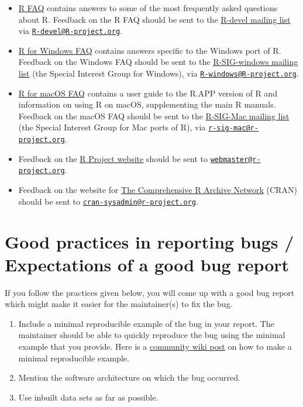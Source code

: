 \documentclass[
]{book}
\providecommand{\tightlist}{%
  \setlength{\itemsep}{0pt}\setlength{\parskip}{0pt}}
\begin{document}
\begin{itemize}
\tightlist
\item
  \href{https://cran.r-project.org/doc/FAQ/R-FAQ.html}{R FAQ} contains answers to some of the most frequently asked questions about R. Feedback on the R FAQ should be sent to the \href{https://stat.ethz.ch/mailman/listinfo/r-devel}{R-devel mailing list} via \href{mailto:R-devel@R-project.org}{\nolinkurl{R-devel@R-project.org}}.
\item
  \href{https://cran.r-project.org/bin/windows/base/rw-FAQ.html}{R for Windows FAQ} contains answers specific to the Windows port of R. Feedback on the Windows FAQ should be sent to the \href{https://stat.ethz.ch/mailman/listinfo/r-sig-windows}{R-SIG-windows mailing list} (the Special Interest Group for Windows), via \href{mailto:R-windows@R-project.org}{\nolinkurl{R-windows@R-project.org}}.
\item
  \href{https://cran.r-project.org/bin/macosx/RMacOSX-FAQ.html}{R for macOS FAQ} contains a user guide to the R.APP version of R and information on using R on macOS, supplementing the main R manuals. Feedback on the macOS FAQ should be sent to the \href{https://stat.ethz.ch/mailman/listinfo/r-sig-mac}{R-SIG-Mac mailing list} (the Special Interest Group for Mac ports of R), via \href{mailto:r-sig-mac@r-project.org}{\nolinkurl{r-sig-mac@r-project.org}}.
\item
  Feedback on the \href{https://www.r-project.org/}{R Project website} should be sent to \href{mailto:webmaster@r-project.org}{\nolinkurl{webmaster@r-project.org}}.
\item
  Feedback on the website for \href{https://cran.r-project.org/}{The Comprehensive R Archive Network} (CRAN) should be sent to \href{mailto:cran-sysadmin@r-project.org}{\nolinkurl{cran-sysadmin@r-project.org}}.
\end{itemize}

\section{Good practices in reporting bugs / Expectations of a good bug report}\label{good-practices-bugs}

If you follow the practices given below, you will come up with a good bug report which might make it easier for the maintainer(s) to fix the bug.

\begin{enumerate}
\def\labelenumi{\arabic{enumi}.}
\item
  Include a minimal reproducible example of the bug in your report. The maintainer should be able to quickly reproduce the bug using the minimal example that you provide. Here is a \href{https://stackoverflow.com/questions/5963269/how-to-make-a-great-r-reproducible-example}{community wiki post} on how to make a minimal reproducible example.
\item
  Mention the software architecture on which the bug occurred.
\item
  Use inbuilt data sets as far as possible.
\end{enumerate}
\end{document}
